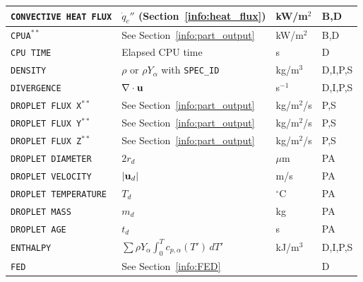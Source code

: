\documentclass[11pt]{book}
\newcommand{\ct}{\tt\small}
\newcommand{\bu}{{\bf u}}
\newcommand{\dq}{\dot{q}}
\begin{document}
\begin{longtable}{@{\extracolsep{\fill}}|l|l|l|l|}
{\ct CONVECTIVE HEAT FLUX}                      & $\dq_c''$ (Section~\ref{info:heat_flux})      & kW/m$^2$       & B,D          \\ \hline
{\ct CPUA}$^{**}$                               & See Section~\ref{info:part_output}            & kW/m$^2$       & B,D          \\ \hline
{\ct CPU TIME}                                  & Elapsed CPU time                              & s              & D            \\ \hline
{\ct DENSITY}                                   & $\rho$ or $\rho Y_\alpha$ with {\ct SPEC\_ID} & kg/m$^3$       & D,I,P,S      \\ \hline
{\ct DIVERGENCE}                                & $\nabla \cdot \bu$                            & s$^{-1}$       & D,I,P,S      \\ \hline
{\ct DROPLET FLUX X}$^{**}$                     & See Section~\ref{info:part_output}            & kg/m$^2$/s     & P,S          \\ \hline
{\ct DROPLET FLUX Y}$^{**}$                     & See Section~\ref{info:part_output}            & kg/m$^2$/s     & P,S          \\ \hline
{\ct DROPLET FLUX Z}$^{**}$                     & See Section~\ref{info:part_output}            & kg/m$^2$/s     & P,S          \\ \hline
{\ct DROPLET DIAMETER}                          & $2 r_d$                                       & $\mu$m         & PA           \\ \hline
{\ct DROPLET VELOCITY}                          & $|\bu_d|$                                     & m/s            & PA           \\ \hline
{\ct DROPLET TEMPERATURE}                       & $T_d$                                         & $^\circ$C      & PA           \\ \hline
{\ct DROPLET MASS}                              & $m_d$                                         & kg             & PA           \\ \hline
{\ct DROPLET AGE}                               & $t_d$                                         & s              & PA           \\ \hline
{\ct ENTHALPY}                                  & $\sum \rho Y_\alpha \int_0^T c_{p,\alpha}(T') \, dT'$  & kJ/m$^3$ & D,I,P,S      \\ \hline
{\ct FED}                                       & See Section~\ref{info:FED}                    &                & D            \\ \hline

\end{longtable}
\end{document}
